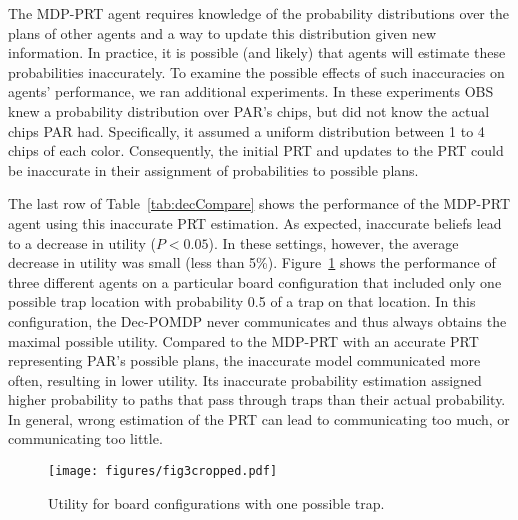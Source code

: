The MDP-PRT agent requires knowledge of the probability distributions over the plans of other agents and a way to update this distribution given new information. In practice, it is possible (and likely) that agents will estimate these probabilities inaccurately. To examine the possible effects of such inaccuracies on agents' performance, we ran additional experiments. In these experiments  OBS  knew a probability distribution over PAR's chips, but did not know the actual chips  PAR had. Specifically, it assumed a uniform distribution between 1 to 4 chips of each color.
 Consequently, the initial PRT and updates to the PRT could be inaccurate in their assignment of probabilities to possible plans. 

The last row of Table~\ref{tab:decCompare} shows the performance of the MDP-PRT agent using this inaccurate PRT estimation. As expected, inaccurate beliefs lead to a decrease in utility ($P<0.05$). In these settings, however, the average decrease in utility was small (less than 5\%). Figure~\ref{fig:inacc} shows the performance of  three different agents on a particular board configuration that included only one possible trap location with probability 0.5 of a trap  on that location. In this configuration, the Dec-POMDP never communicates and thus always obtains the maximal possible utility. Compared to the MDP-PRT with an accurate PRT representing PAR's possible plans, the inaccurate model communicated more often, resulting in lower utility. Its inaccurate probability estimation assigned higher probability to paths that pass through traps than their actual probability. In general, wrong estimation of the PRT can lead to communicating too much, or communicating too little. 


	\begin{figure}
	\centering
	\texttt{[image: figures/fig3cropped.pdf]}
	\caption{Utility for board configurations with one possible trap.}
	\label{fig:inacc}
	    \vspace{-0.5cm}
	\end{figure}

